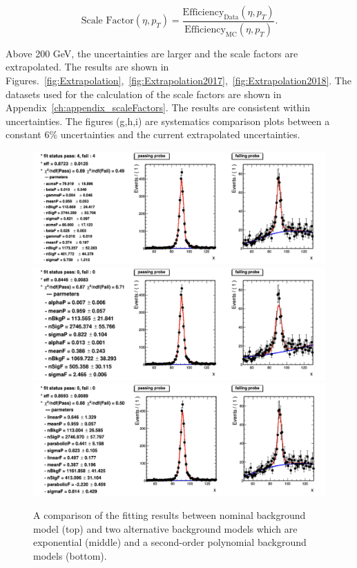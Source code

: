 \begin{equation} \label{eq:SF}
  \text{Scale Factor}(\eta,p_{T}) = \frac{\text{Efficiency}_{\text{Data}}(\eta,p_{T})}{\text{Efficiency}_{\text{MC}}(\eta,p_{T})}.
\end{equation}

Above 200 GeV, the uncertainties are larger and the scale factors are extrapolated. The results are shown in Figures.~\ref{fig:Extrapolation},~\ref{fig:Extrapolation2017},~\ref{fig:Extrapolation2018}. The datasets used for the calculation of the scale factors are shown in Appendix~\ref{ch:appendix_scaleFactors}. The results are consistent within uncertainties. The figures (g,h,i) are systematics comparison plots between a constant 6\% uncertainties and the current extrapolated uncertainties.

\begin{figure}[!htbp]
  \centering
  \includegraphics[width=1.0\textwidth]{fig/NominalBkg.png}\\
  \includegraphics[width=1.0\textwidth]{fig/AltBkg_exponential.png}\\
 \includegraphics[width=1.0\textwidth]{fig/AltBkg_Polynomial.png}
  \caption{A comparison of the fitting results between nominal background model (top) and two alternative background models which are exponential (middle) and a second-order polynomial background models (bottom).}
  \label{fig:Sysbkg}
\end{figure}

